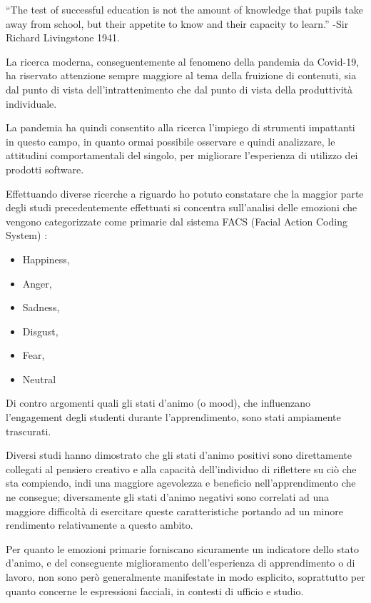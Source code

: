 \begin{preface}
    “The test of successful education is not the amount of knowledge that pupils take away from school, but their appetite to know and their capacity to learn.” 
    -Sir Richard Livingstone 1941. \cite{Livingstone}
    
    La ricerca moderna, conseguentemente al fenomeno della pandemia da Covid-19, ha riservato attenzione sempre maggiore al tema della fruizione di contenuti, sia dal punto di vista dell’intrattenimento che dal punto di vista della produttività individuale.
    
    La pandemia ha quindi consentito alla ricerca l’impiego di strumenti impattanti in questo campo, in quanto ormai possibile osservare e quindi analizzare, le attitudini comportamentali del singolo, per migliorare l’esperienza di utilizzo dei prodotti software.
    
    Effettuando diverse ricerche a riguardo ho potuto constatare che la maggior parte degli studi precedentemente effettuati si concentra sull’analisi delle emozioni che vengono categorizzate come primarie dal sistema FACS (Facial Action Coding System) \cite{FacialCodingContinMonitor}:
    \begin{itemize}
        \item Happiness,
        \item Anger,
        \item Sadness,
        \item Disgust,
        \item Fear,
        \item Neutral
    \end{itemize}
    
    Di contro argomenti quali gli stati d’animo (o mood), che influenzano l’engagement degli studenti durante l’apprendimento, sono stati ampiamente trascurati.
    
    Diversi studi hanno dimostrato che gli stati d’animo positivi sono direttamente collegati al pensiero creativo e alla capacità dell’individuo di riflettere su ciò che sta compiendo, indi una maggiore agevolezza e beneficio nell’apprendimento che ne consegue; diversamente gli stati d’animo negativi sono correlati ad una maggiore difficoltà di esercitare queste caratteristiche portando ad un minore rendimento relativamente a questo ambito.
    
    Per quanto le emozioni primarie forniscano sicuramente un indicatore dello stato d’animo, e del conseguente miglioramento dell’esperienza di apprendimento o di lavoro, non sono però generalmente manifestate in modo esplicito, soprattutto per quanto concerne le espressioni facciali, in contesti di ufficio e studio.
    

\end{preface}
